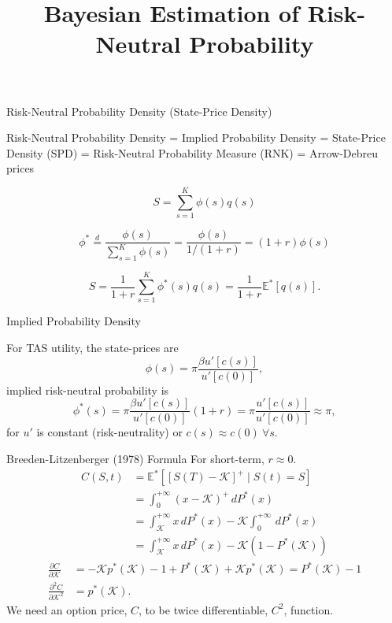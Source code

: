 \documentclass[10pt,aspectratio=43]{beamer}
\title{Bayesian Estimation of Risk-Neutral Probability}
\begin{document}
\begin{frame}[fragile]
    \titlepage
\end{frame}




\begin{frame}{ Risk-Neutral Probability Density (State-Price Density)}

Risk-Neutral Probability Density = Implied Probability Density = State-Price Density (SPD) = Risk-Neutral Probability Measure (RNK) = Arrow-Debreu prices

    \[S=\sum_{s=1}^K\phi(s)q(s)\]

    

    \[\phi^*\overset{d}{=}\frac{\phi(s)}{\sum_{s=1}^K\phi(s)}=\frac{\phi(s)}{1/(1+r)}=(1+r)\phi(s)\]

    \[S=\frac{1}{1+r}\sum_{s=1}^K\phi^*(s)q(s)=\frac{1}{1+r}\mathbb{E}^*[q(s)].\]

\end{frame}
\begin{frame}{Implied  Probability Density}
 
    For TAS utility, the state-prices are 
    \[\phi(s)=\pi\frac{\beta u'[c(s)]}{u'[c(0)]},\]
    \then implied risk-neutral probability is
    \[\phi^*(s)=\pi\frac{\beta u'[c(s)]}{u'[c(0)]}(1+r)= \pi\frac{u'[c(s)]}{u'[c(0)]}\approx \pi,\]
    for $u'$ is constant (risk-neutrality) or $c(s)\approx c(0)~\forall s$.


\end{frame}




\begin{frame}{Breeden-Litzenberger (1978) Formula}
\nocite{breedenPricesStateContingentClaims1978}
For short-term, $r\approx 0$.
    \begin{align*}
        C(S,t)&=\mathbb{E}^*\left[[S(T)-\mathcal{K}]^+\mid S(t)=S\right]\\ 
        &=\int_0^{+\infty}(x-\mathcal{K})^+\,dP^*(x)\\ &=\int_{\mathcal{K}}^{+\infty}x\,dP^*(x)-\mathcal{K}\int_0^{+\infty}\,dP^*(x)\\ 
        &=\int_{\mathcal{K}}^{+\infty}x\,dP^*(x)-\mathcal{K}(1-P^*(\mathcal{K}))
    \end{align*}
    \begin{align*}
        \frac{\partial C}{\partial \mathcal{K}}&=-\mathcal{K}p^*(\mathcal{K})-1+P^*(\mathcal{K})+\mathcal{K}p^*(\mathcal{K})=P^*(\mathcal{K})-1\\ 
        \frac{\partial^2 C}{\partial \mathcal{K}^2}&=p^*(\mathcal{K}).
    \end{align*}
   We need an option price, $C$, to be twice differentiable, $C^2$, function. 
\end{frame}
\end{document}
